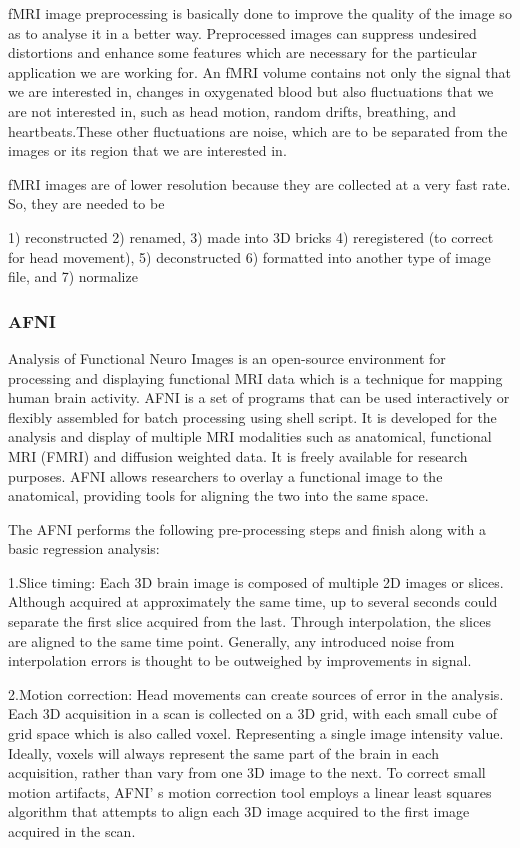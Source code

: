 \documentclass{article}
\begin{document}
fMRI image preprocessing is basically
done to improve the quality of the image so as to analyse it in a
better way. Preprocessed images can suppress undesired distortions
and enhance some features which are necessary for the particular
application we are working for. An fMRI volume contains not only the
signal that we are interested in, changes in oxygenated blood but also
fluctuations that we are not interested in, such as head motion,
random drifts, breathing, and heartbeats.These other fluctuations are
noise, which are to be separated from the images or its region that we
are interested in.

fMRI images are of lower resolution because they are collected at a
very fast rate. So, they are needed to be

1) reconstructed
2) renamed,
3) made into 3D bricks
4) reregistered (to correct for head movement),
5) deconstructed
6) formatted into another type of image file, and
7) normalize

\subsubsection{AFNI}

Analysis of Functional Neuro Images is an open-source environment for
processing and displaying functional MRI data which is a technique for
mapping human brain activity. AFNI is a set of programs that can be
used interactively or flexibly assembled for batch processing using
shell script. It is developed for the analysis and display of multiple
MRI modalities such as anatomical, functional MRI (FMRI) and diffusion
weighted data. It is freely available for research purposes. AFNI
allows researchers to overlay a functional image to the anatomical,
providing tools for aligning the two into the same space.

The AFNI performs the following pre-processing steps and finish along
with a basic regression analysis:

1.Slice timing: Each 3D brain image is composed of multiple 2D images
or slices. Although acquired at approximately the same time, up to
several seconds could separate the first slice acquired from the last.
Through interpolation, the slices are aligned to the same time point.
Generally, any introduced noise from interpolation errors is thought
to be outweighed by improvements in signal.

2.Motion correction: Head movements can create sources of error in the
analysis. Each 3D acquisition in a scan is collected on a 3D grid,
with each small cube of grid space which is also called voxel.
Representing a single image intensity value. Ideally, voxels will
always represent the same part of the brain in each acquisition,
rather than vary from one 3D image to the next. To correct small
motion artifacts, AFNI' s motion correction tool employs a linear
least squares algorithm that attempts to align each 3D image acquired
to the first image acquired in the scan.
\end{document}
